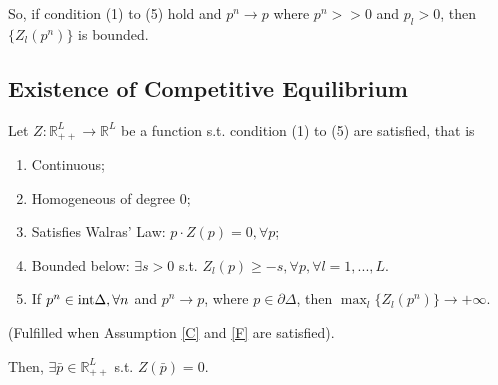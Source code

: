 \documentclass[11pt]{elegantbook}
\begin{document}
So, if condition (1) to (5) hold and $p^n \rightarrow p$ where $p^n >>0$ and $p_l>0$, then $\{Z_l(p^n)\}$ is bounded.

\subsection{Existence of Competitive Equilibrium}
\begin{theorem}
    Let $Z: \mathbb{R}^L_{++} \rightarrow \mathbb{R}^L$ be a function s.t. condition (1) to (5) are satisfied, that is
    \begin{enumerate}[(1).]
        \item Continuous;
        \item Homogeneous of degree $0$;
        \item Satisfies Walras' Law: $p\cdot Z(p)=0, \forall p$;
        \item Bounded below: $\exists s>0$ s.t. $Z_l(p)\geq -s, \forall p, \forall l=1,...,L$.
        \item If $p^n\in \textnormal{int}\Delta, \forall n$ and $p^n \rightarrow p$, where $p\in \partial \Delta$, then $\max_l\{Z_l(p^n)\}\rightarrow +\infty$.
    \end{enumerate}
    \begin{note}
        (Fulfilled when Assumption \ref{C} and \ref{F} are satisfied).
    \end{note}
    Then, $\exists \bar{p}\in \mathbb{R}^L_{++}$ s.t. $Z(\bar{p})=0$.
\end{theorem}
\end{document}
